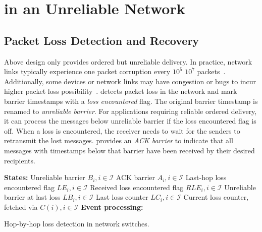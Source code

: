\section{\sys in an Unreliable Network}
\label{sec:reliable}


\subsection{Packet Loss Detection and Recovery}
\label{subsec:loss-recovery}

Above design only provides ordered but unreliable delivery.
In practice, network links typically experience one packet corruption every $10^5$ \texttildelow $10^7$ packets~\cite{zhuo2017understanding}.
Additionally, some devices or network links may have congestion or bugs to incur higher packet loss possibility~\cite{guo2015pingmesh}.
\sys detects packet loss in the network and mark barrier timestamps with a \textit{loss encountered} flag.
The original barrier timestamp is renamed to \textit{unreliable barrier}.
For applications requiring reliable ordered delivery, it can process the messages below unreliable barrier if the loss encountered flag is off.
When a loss is encountered, the receiver needs to wait for the senders to retransmit the lost messages.
\sys provides an \textit{ACK barrier} to indicate that all messages with timestamps below that barrier have been received by their desired recipients.

\setlength{\textfloatsep}{1em}
\begin{algorithm}[t]
 \DontPrintSemicolon
 \textbf{States:} Unreliable barrier $B_i, i \in \mathcal{I}$\;
 	\qquad ACK barrier $A_i, i \in \mathcal{I}$\;
 	\qquad Last-hop loss encountered flag $LE_i, i \in \mathcal{I}$\;
    \qquad Received loss encountered flag $RLE_i, i \in \mathcal{I}$\;
    \qquad Unreliable barrier at last loss $LB_i, i \in \mathcal{I}$\;
    \qquad Last loss counter $LC_i, i \in \mathcal{I}$\;
    \qquad Current loss counter, fetched via $C(i), i \in \mathcal{I}$\;
 \textbf{Event processing:}\\
 \caption{Hop-by-hop loss detection in network switches.}
 \label{alg:loss-detection}
\end{algorithm}

